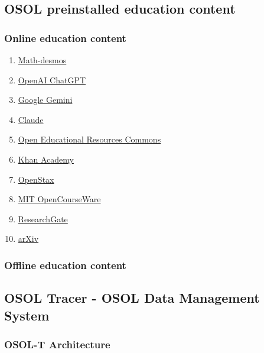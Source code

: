 \documentclass[a4paper,11pt]{article}
\begin{document}
\subsection{OSOL preinstalled education content}
\subsubsection{Online education content}\label{sec:online-education-content}
\begin{enumerate}
	\item {\href{https://www.desmos.com/}{Math-desmos}}
	\item {\href{https://chatgpt.com/}{OpenAI ChatGPT}}
	\item {\href{https://gemini.google.com/}{Google Gemini}}
	\item {\href{https://claude.ai/}{Claude}}
	\item {\href{https://oercommons.org/}{Open Educational Resources Commons}}
	\item {\href{https://www.khanacademy.org/}{Khan Academy}}
	\item {\href{https://openstax.org/}{OpenStax}}
	\item {\href{https://ocw.mit.edu/}{MIT OpenCourseWare}}
	\item {\href{https://www.researchgate.net/}{ResearchGate}}
	\item {\href{https://arxiv.org/}{arXiv}}
\end{enumerate}
\subsubsection{Offline education content}\label{sec:offline-education-content}

	
\subsection{OSOL Tracer - OSOL Data Management System}
\subsubsection{OSOL-T Architecture}
\end{document}
